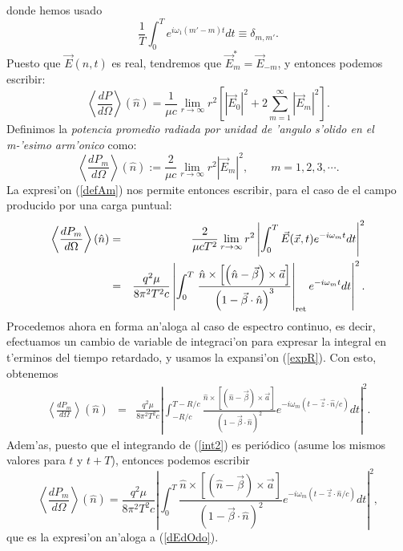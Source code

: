 donde hemos usado
\begin{equation}
\frac{1}{T}\int_0^{T}e^{i\omega_1\left(m'-m\right)t }dt\equiv\delta_{m,m' }.
\end{equation}
Puesto que $\vec{E}(\hat{n},t)$ es real, tendremos que $\vec{E}_{m}^*=\vec{E}_{-m}$, y entonces podemos escribir:
\begin{equation}\label{dPdOsumm}
\left\langle\frac{dP}{d\Omega}\right\rangle (\hat{n}) =\frac{1}{\mu c}\lim_{r\to\infty}r^2\left[\left|\vec{E}_0\right|^2
+2\sum_{m=1}^{\infty}\left|\vec{E}_{m}\right|^2\right].
\end{equation}
Definimos la \textit{potencia promedio radiada por
unidad de 'angulo s'olido en el m-'esimo arm'onico} como:
\begin{equation}
\left\langle\frac{dP_{m}}{d\Omega}\right\rangle (\hat{n}) :=\frac{2}{\mu c}\lim_{r\to\infty}r^2\left|\vec{E}_{m}\right|^2, \qquad m=1,2,3,\cdots.
\end{equation}
La expresi'on (\ref{defAm}) nos permite entonces escribir, para el caso de el campo producido por una carga puntual:
\begin{eqnarray}
\left\langle \frac{dP_{m}}{d\Omega}\right\rangle (\hat{n})&=&
\frac{2}{\mu cT^2}\lim_{r\to\infty}r^2\left|\int_0^{T}\vec{E}(\vec{x},t)e^{-i\omega_{m}t}dt\right|^2\\
&=&\frac{q^2\mu}{8\pi^2T^2c}\left| \int_0^{T}\left.\frac{\hat{n}\times\left[  \left(\hat{n}-\vec{\beta}\right)\times\vec{a}\right] }{\left(
1-\vec{\beta}\cdot\hat{n}\right)^3}\right|_{\rm ret} e^{-i\omega_{m}t}dt\right|^2.
\end{eqnarray}
Procedemos ahora en forma an'aloga al caso de espectro continuo, es decir, efectuamos un cambio de variable de integraci'on para expresar la integral en t'erminos del tiempo retardado, y usamos la expansi'on (\ref{expR}). Con esto, obtenemos
\begin{eqnarray}
\left\langle \frac{dP_{m}}{d\Omega}\right\rangle (\hat{n})
  &=&\frac{q^2\mu}{8\pi^2T^2c}\left|
\int_{-{R}/{c}}^{T-{R}/{c}}\frac{\hat{n}\times\left[\left(\hat{n}-\vec{
\beta}\right)\times\vec{a}\right]}{\left(1-\vec{\beta}\cdot\hat{n}\right)^2} e^{-i\omega_{m}\left(t-\vec{z}\cdot\hat{n}/c\right)}dt \right|^2. \label{int2}
\end{eqnarray}
Adem'as, puesto que el integrando de (\ref{int2}) es periódico (asume los
mismos valores para $t$ y $t+T$), entonces podemos escribir
\begin{equation}
\boxed{\left\langle \frac{dP_{m}}{d\Omega}\right\rangle (\hat{n})
=\frac{q^2\mu}{8\pi^2T^2c}\left|
\int_0^{T}\frac{\hat{n}\times\left[\left(\hat{n}-\vec{\beta}\right)
\times\vec{a}\right]}{\left(1-\vec{\beta}\cdot\hat{n}\right)^2} e^{-i\omega_{m}\left(t-\vec{z}\cdot\hat{n}/c\right)}dt \right|^2, }\label{int3}
\end{equation}
que es la expresi'on an'aloga a (\ref{dEdOdo}).

